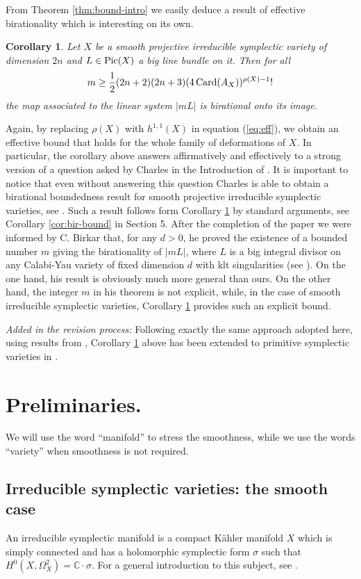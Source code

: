 \documentclass[12pt,reqno]{amsart}
\def\C{{\mathbb C}}
\def\Pic{\mathop{\rm Pic}\nolimits}
\def\Pic{\mathop{\rm Pic}\nolimits}
\def\Card{\mathop{\rm Card}\nolimits}
\newtheorem{cor}[thm]{Corollary}
\theoremstyle{plain}
\theoremstyle{definition}
\begin{document}
From Theorem \ref{thm:bound-intro} we easily deduce a result of effective birationality which is interesting on its own.
\begin{cor}\label{cor:eff-bir-bound}
Let $X$ be a smooth projective irreducible symplectic variety of dimension $2n$ and $L\in \Pic(X)$ a big line bundle on it. 
Then for all 
\begin{equation}\label{eq:eff} 
m\geq \frac{1}{2}(2n+2)(2n+3)(4\Card(A_X))^{\rho(X)-1} !
\end{equation}
the map associated to the linear system $|mL|$
is birational onto its image. 
\end{cor}
Again, by replacing $\rho(X)$ with $h^{1,1}(X)$ in equation (\ref{eq:eff}), we obtain an effective bound that holds for the whole family of deformations of $X$.
In particular, the corollary above answers affirmatively and effectively to a strong version of a question asked by Charles in the Introduction of \cite{Charles}. 
It is important to notice that even without answering this question Charles is able to obtain a birational boundedness result for smooth projective irreducible symplectic varieties, see \cite[Theorem 1.2]{Charles}. 
Such a result follows form Corollary \ref{cor:eff-bir-bound} by standard arguments, see Corollary \ref{cor:bir-bound} in Section 5. 
After the completion of the paper we were informed by C. Birkar that, for any $d>0$, he proved the existence of a bounded number $m$  giving the birationality of $|mL|$, where $L$ is a big integral divisor on any Calabi-Yau variety of fixed dimension $d$ with klt singularities (see \cite[Corollary 1.4]{Bi}). On the one hand, his result is obviously much more general than ours. On the other hand, the integer $m$ in his theorem is not explicit, while, in the case of smooth irreducible symplectic varieties, Corollary \ref{cor:eff-bir-bound} provides such an explicit bound.

{\it Added in the revision process:} Following exactly the same approach adopted here, using results from \cite{LMP2}, Corollary \ref{cor:eff-bir-bound} above has been extended to primitive symplectic varieties in \cite[Theorem 1.1]{LMP3}. 
\section{Preliminaries.}

We will use the word ``manifold'' to stress the smoothness, while we use the words ``variety'' when smoothness
is not required. 

\subsection{Irreducible symplectic varieties: the smooth case}
An irreducible symplectic manifold is a compact K\"ahler manifold $X$ which is simply connected and has a holomorphic symplectic
form $\sigma$ such that $H^0(X,\Omega^2_X)=\C\cdot \sigma$. For a general introduction to this subject, see \cite{Huy-basic}.
\end{document}
